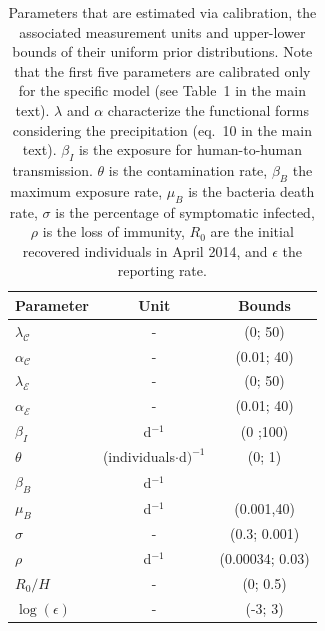\begin{table}[h!]
\centering
\begin{tabular}{lcc}
\toprule
			Parameter & Unit & Bounds\\
\midrule
    $\lambda_{\mathcal{C}}$ &   -    &   (0; 50) \\
    $\alpha_\mathcal{C}$    &   -    &   (0.01; 40)\\
    $\lambda_{\mathcal{E}}$ &    -   &   (0; 50) \\
    $\alpha_\mathcal{E}$    &  -     &   (0.01; 40) \\
   $\beta_I$               & d$^{-1}$&  (0 ;100)  \\
   \hline
  $\theta$               & (individuals$\cdot$d$)^{-1}$ &(0; 1)  \\
  $\beta_B$             &d$^{-1}$     & \\
  $\mu_B$ &  d$^{-1}$ & (0.001,40) \\
  $\sigma$ &- &(0.3; 0.001) \\
  $\rho$ &  d$^{-1}$ & (0.00034; 0.03)\\
  $R_0/H$ & - &  (0; 0.5) \\
  $\log(\epsilon)$ & - &  (-3; 3)\\
\bottomrule
\end{tabular}
\caption[Parameters that are estimated via calibration]{Parameters that are estimated via calibration, the associated measurement units and upper-lower bounds of their uniform prior distributions. Note that the first five parameters are calibrated only for the specific model (see Table~1 in the main text). $\lambda$ and $\alpha$ characterize the functional forms considering the precipitation (eq.~10 in the main text). $\beta_I$ is the exposure for human-to-human transmission. $\theta$ is the contamination rate, $\beta_B$ the maximum exposure rate, $\mu_B$ is the bacteria death rate, $\sigma$ is the percentage of symptomatic infected, $\rho$ is the loss of immunity, $R_0$ are the initial  recovered individuals in April 2014, and $\epsilon$ the reporting rate.}
\label{tab:prior}
\end{table}

